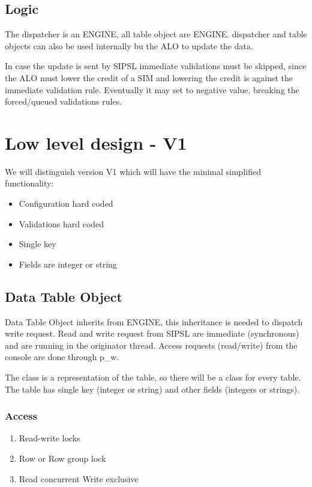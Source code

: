 \documentclass[a4paper]{article}
\begin{document}
\subsection{Logic}

The dispatcher is an ENGINE, all table object are ENGINE.
dispatcher and table objects can also be used internally bu the ALO to update
the data.


In case the update is sent by SIPSL immediate validations must be skipped,
since the ALO must lower the credit of a SIM and lowering the credit is against
the immediate validation rule.
Eventually it may set to negative value, breaking the forced/queued validations
rules.

\section{Low level design - V1}
We will distinguish version V1 which will have the minimal
simplified functionality: 
\begin{itemize}
	\item {Configuration hard coded}
	\item {Validations hard coded}
	\item {Single key}
	\item {Fields are integer or string}
\end{itemize}


\subsection{Data Table Object}
Data Table Object inherits from ENGINE, this inheritance is needed to dispatch
write request. Read and write request from SIPSL are immediate (synchronous) and
are running in the originator thread.
Access requests (read/write) from the console are done through p\_w.

The class is a representation of the table, so there will be a class for
every table.
The table has single key (integer or string) and other fields (integers or
strings).

\subsubsection{Access}

\begin{enumerate}
        \item Read-write locks 
        \item Row or Row group lock
        \item Read concurrent Write exclusive
\end{enumerate}
\end{document}
